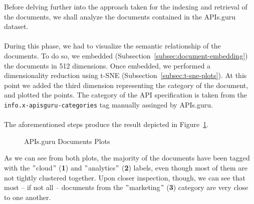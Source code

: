 Before delving further into the approach taken for the indexing and retrieval of the documents, we shall analyze the documents contained in the APIs.guru dataset. \\ \\
During this phase, we had to visualize the semantic relationship of the documents.
To do so, we embedded (Subsection~\ref{subsec:document-embedding}) the documents in 512 dimensions.
Once embedded, we performed a dimensionality reduction using t-SNE (Subsection~\ref{subsec:t-sne-plots}).
At this point we added the third dimension representing the category of the document, and plotted the points.
The category of the API specification is taken from the \verb|info.x-apisguru-categories| tag manually assinged by APIs.guru. \\ \\
The aforementioned steps produce the result depicted in Figure~\ref{fig:documents-plot}.
\begin{figure}%
    \centering
    \qquad
    \caption{APIs.guru Documents Plots}%
    \label{fig:documents-plot}%
\end{figure}
As we can see from both plots, the majority of the documents have been tagged with the \("\)cloud\("\) (\textbf{1}) and \("\)analytics\("\) (\textbf{2}) labels, even though most of them are not tightly clustered together.
Upon closer inspection, though, we can see that most -- if not all -- documents from the \("\)marketing\("\) (\textbf{3}) category are very close to one another.